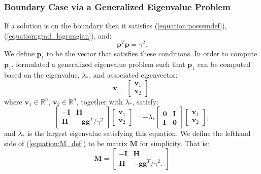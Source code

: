 \documentclass[letterpaper,12pt,titlepage,oneside,final]{book}
\begin{document}
	\subsubsection{Boundary Case via a Generalized Eigenvalue Problem}
	
	If a solution is on the boundary then it satisfies (\ref{equation:possemdef}), (\ref{equation:grad_lagrangian}), and:
	\begin{equation}
	\mathbf{p}^{T}\mathbf{p} = \gamma^{2}.
	\label{equation:boundary}
	\end{equation}
	We define $\mathbf{p}_{1}$ to be the vector that satisfies these conditions. In order to compute $\mathbf{p}_{1}$, \cite{adachi.paper} formulated a generalized eigenvalue problem such that $\mathbf{p}_{1}$ can be computed based on the eigenvalue, $\lambda_{*}$, and associated eigenvector:
	\begin{equation}
	\mathbf{v} = \begin{bmatrix}\mathbf{v}_{1} \\ \mathbf{v}_{2} \end{bmatrix}.
	\end{equation}
	where $\mathbf{v}_{1} \in \mathbb{R}^{n}$, $\mathbf{v}_{2} \in \mathbb{R}^{n}$, together with $\lambda_{*}$, satisfy:
	\begin{equation}
	\begin{bmatrix}
	-\mathbf{I} & \mathbf{H} \\
	\mathbf{H} & -\mathbf{gg}^{T}/\gamma^{2}
	\end{bmatrix}
	\begin{bmatrix}
	\mathbf{v}_{1} \\
	\mathbf{v}_{2} 
	\end{bmatrix}
	= -\lambda_{*}
	\begin{bmatrix}
	\mathbf{0} & \mathbf{I} \\
	\mathbf{I} & \mathbf{0}
	\end{bmatrix}
	\begin{bmatrix}
	\mathbf{v}_{1} \\
	\mathbf{v}_{2} 
	\end{bmatrix},
	\label{equation:M_def}
	\end{equation}
	and $\lambda_{*}$ is the largest eigenvalue satisfying this equation. We define the lefthand side of (\ref{equation:M_def}) to be matrix $\mathbf{M}$ for simplicity. That is:
	\begin{equation}
	\mathbf{M} = 
	\begin{bmatrix}
	-\mathbf{I} & \mathbf{H} \\
	\mathbf{H} & -\mathbf{gg}^{T}/\gamma^{2}.
	\end{bmatrix}
	\label{equation:M}
	\end{equation}
		
\end{document}
